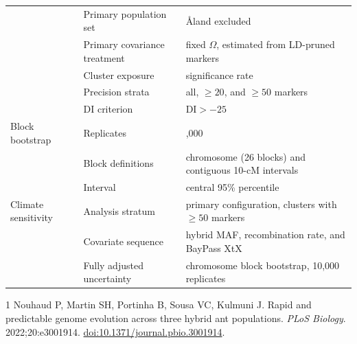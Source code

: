 \documentclass[11pt]{article}
\begin{document}
\begin{longtable}{>{\raggedright\arraybackslash}p{}
                  >{\raggedright\arraybackslash}p{}
                  >{\raggedright\arraybackslash}p{}}
        & Primary population set & \AA{}land excluded \\
        & Primary covariance treatment & fixed \(\Omega\), estimated from LD-pruned markers \\
        & Cluster exposure & significance rate \\
        & Precision strata & all, \(\geq20\), and \(\geq50\) markers \\
        & DI criterion & \(\mathrm{DI}>-25\) \\
\midrule
Block bootstrap & Replicates & 10,000 \\
                & Block definitions & chromosome (26 blocks) and contiguous 10-cM intervals \\
                & Interval & central 95\% percentile \\
\midrule
Climate sensitivity & Analysis stratum & primary configuration, clusters with \(\geq50\) markers \\
                    & Covariate sequence & hybrid MAF, recombination rate, and BayPass XtX \\
                    & Fully adjusted uncertainty & chromosome block bootstrap, 10,000 replicates \\
\bottomrule
\end{longtable}

\begin{thebibliography}{1}
Nouhaud P, Martin SH, Portinha B, Sousa VC, Kulmuni J. Rapid and
predictable genome evolution across three hybrid ant populations.
\textit{PLoS Biology}. 2022;20:e3001914.
\href{https://doi.org/10.1371/journal.pbio.3001914}
{doi:10.1371/journal.pbio.3001914}.
\end{thebibliography}
\end{document}
